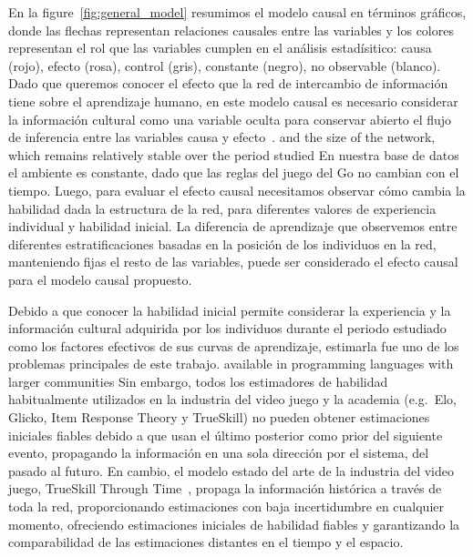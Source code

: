 \documentclass[a4paper,11pt]{book}
\theoremstyle{definition}
\begin{document}
En la figure~\ref{fig:general_model} resumimos el modelo causal en términos gráficos, donde las flechas representan relaciones causales entre las variables y los colores representan el rol que las variables cumplen en el análisis estadísitico: causa (rojo), efecto (rosa), control (gris), constante (negro), no observable (blanco).
%
Dado que queremos conocer el efecto que la red de intercambio de información tiene sobre el aprendizaje humano, en este modelo causal es necesario considerar la información cultural como una variable oculta para conservar abierto el flujo de inferencia entre las variables causa y efecto~\cite{pearl2009-causality}.
%
and the size of the network, which remains relatively stable over the period studied
En nuestra base de datos el ambiente es constante, dado que las reglas del juego del Go no cambian con el tiempo.%
%
Luego, para evaluar el efecto causal necesitamos observar cómo cambia la habilidad dada la estructura de la red, para diferentes valores de experiencia individual y habilidad inicial.
%
La diferencia de aprendizaje que observemos entre diferentes estratificaciones basadas en la posición de los individuos en la red, manteniendo fijas el resto de las variables, puede ser considerado el efecto causal para el modelo causal propuesto.

Debido a que conocer la habilidad inicial permite considerar la experiencia y la información cultural adquirida por los individuos durante el periodo estudiado como los factores efectivos de sus curvas de aprendizaje, estimarla fue uno de los problemas principales de este trabajo.
%
available in programming languages with larger communities
Sin embargo, todos los estimadores de habilidad habitualmente utilizados en la industria del video juego y la academia (e.g.~Elo, Glicko, Item Response Theory y TrueSkill) no pueden obtener estimaciones iniciales fiables debido a que usan el último posterior como prior del siguiente evento, propagando la información en una sola dirección por el sistema, del pasado al futuro.%
%
En cambio, el modelo estado del arte de la industria del video juego, TrueSkill Through Time~\cite{Landfried2021-TTT, Dangauthier2007}, propaga la información histórica a través de toda la red, proporcionando estimaciones con baja incertidumbre en cualquier momento, ofreciendo estimaciones iniciales de habilidad fiables y garantizando la comparabilidad de las estimaciones distantes en el tiempo y el espacio.
\end{document}
